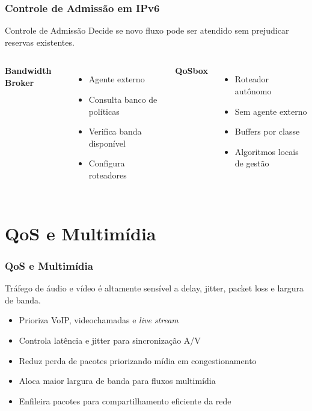 \documentclass{beamer}
\begin{document}
  \begin{frame}
    \frametitle{Controle de Admissão em IPv6}
    \begin{block}{Controle de Admissão}
      Decide se novo fluxo pode ser atendido sem prejudicar reservas existentes.
    \end{block}
    \vspace{0.5em}
    \begin{columns}
      \textbf{Bandwidth Broker}
      \begin{itemize}
        \item Agente externo
        \item Consulta banco de políticas
        \item Verifica banda disponível
        \item Configura roteadores
      \end{itemize}
      \textbf{QoSbox}
      \begin{itemize}
        \item Roteador autônomo
        \item Sem agente externo
        \item Buffers por classe
        \item Algoritmos locais de gestão
      \end{itemize}
    \end{columns}
  \end{frame}

  \section{QoS e Multimídia}

  \begin{frame}
    \frametitle{QoS e Multimídia}
    Tráfego de áudio e vídeo é \alert{altamente sensível} a delay, jitter,
    packet loss e largura de banda.
    \vspace{0.5em}
    \begin{itemize}
      \item<2-> Prioriza VoIP, videochamadas e \textit{live stream}
      \item<3-> Controla latência e jitter para sincronização A/V
      \item<4-> Reduz perda de pacotes priorizando mídia em congestionamento
      \item<5-> Aloca maior largura de banda para fluxos multimídia
      \item<6-> Enfileira pacotes para compartilhamento eficiente da rede
    \end{itemize}
  \end{frame}
\end{document}
